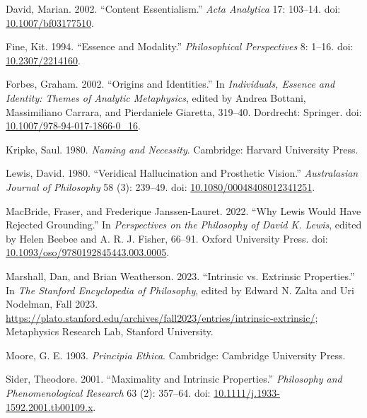 \documentclass[
  10pt,
  letterpaper,
  DIV=11,
  numbers=noendperiod,
  twoside]{scrartcl}
\newlength{\cslhangindent}
\newenvironment{CSLReferences}[2] %
 {\begin{list}{}{%
  \setlength{\itemindent}{0pt}
  \setlength{\leftmargin}{0pt}
  \setlength{\parsep}{0pt}
  \ifodd #1
   \setlength{\leftmargin}{\cslhangindent}
   \setlength{\itemindent}{-1\cslhangindent}
  \fi
  \setlength{\itemsep}{#2\baselineskip}}}
 {\end{list}}
\begin{document}
\label{refs}
\begin{CSLReferences}{1}{0}
David, Marian. 2002. {``Content Essentialism.''} \emph{Acta Analytica}
17: 103--14. doi:
\href{https://doi.org/10.1007/bf03177510}{10.1007/bf03177510}.

Fine, Kit. 1994. {``Essence and Modality.''} \emph{Philosophical
Perspectives} 8: 1--16. doi:
\href{https://doi.org/10.2307/2214160}{10.2307/2214160}.

Forbes, Graham. 2002. {``Origins and Identities.''} In
\emph{Individuals, Essence and Identity: Themes of Analytic
Metaphysics}, edited by Andrea Bottani, Massimiliano Carrara, and
Pierdaniele Giaretta, 319--40. Dordrecht: Springer. doi:
\href{https://doi.org/10.1007/978-94-017-1866-0_16}{10.1007/978-94-017-1866-0\_16}.

Kripke, Saul. 1980. \emph{Naming and Necessity}. Cambridge: Harvard
University Press.

Lewis, David. 1980. {``Veridical Hallucination and Prosthetic Vision.''}
\emph{Australasian Journal of Philosophy} 58 (3): 239--49. doi:
\href{https://doi.org/10.1080/00048408012341251}{10.1080/00048408012341251}.

MacBride, Fraser, and Frederique Janssen-Lauret. 2022. {``Why Lewis
Would Have Rejected Grounding.''} In \emph{Perspectives on the
Philosophy of David {K}. Lewis}, edited by Helen Beebee and A. R. J.
Fisher, 66--91. {O}xford {U}niversity {P}ress. doi:
\href{https://doi.org/10.1093/oso/9780192845443.003.0005}{10.1093/oso/9780192845443.003.0005}.

Marshall, Dan, and Brian Weatherson. 2023. {``{Intrinsic vs. Extrinsic
Properties}.''} In \emph{The {Stanford} Encyclopedia of Philosophy},
edited by Edward N. Zalta and Uri Nodelman, {F}all 2023.
\url{https://plato.stanford.edu/archives/fall2023/entries/intrinsic-extrinsic/};
Metaphysics Research Lab, Stanford University.

Moore, G. E. 1903. \emph{Principia Ethica}. Cambridge: Cambridge
University Press.

Sider, Theodore. 2001. {``Maximality and Intrinsic Properties.''}
\emph{Philosophy and Phenomenological Research} 63 (2): 357--64. doi:
\href{https://doi.org/10.1111/j.1933-1592.2001.tb00109.x}{10.1111/j.1933-1592.2001.tb00109.x}.


\end{CSLReferences}
\end{document}
